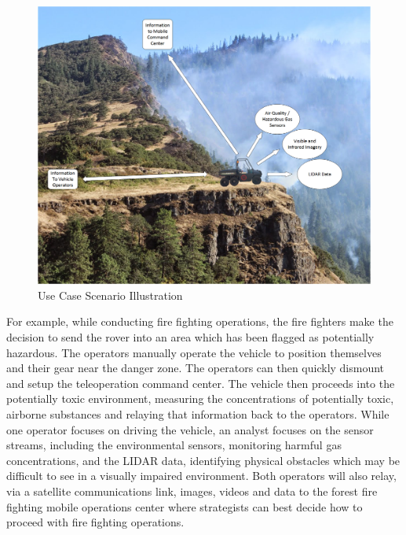 \begin{figure}[H]
\centering
\includegraphics[width=0.75\linewidth]{UseCaseIllustration}
\caption{Use Case Scenario Illustration}
\label{fig:usecase}
\end{figure}
For example, while conducting fire fighting operations, the fire fighters make the decision to send the rover into an area which has been flagged as potentially hazardous. The operators manually operate the vehicle to position themselves and their gear near the danger zone. The operators can then quickly dismount and setup the teleoperation command center. The vehicle then proceeds into the potentially toxic environment, measuring the concentrations of potentially toxic, airborne substances and relaying that information back to the operators. While one operator focuses on driving the vehicle, an analyst focuses on the sensor streams, including the environmental sensors, monitoring harmful gas concentrations, and the LIDAR data, identifying physical obstacles which may be difficult to see in a visually impaired environment. Both operators will also relay, via a satellite communications link, images, videos and data to the forest fire fighting mobile operations center where strategists can best decide how to proceed with fire fighting operations.
%
